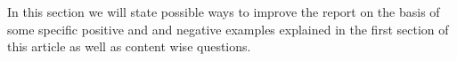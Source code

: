 \documentclass[../review.tex]{subfiles}
\begin{document}
In this section we will state possible ways to improve the report on the basis of some specific positive and and negative examples explained in the first section of this article as well as content wise questions.
\end{document}
